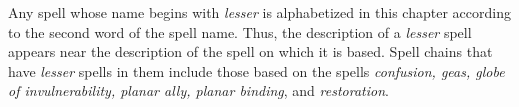 
Any spell whose name begins with \textit{lesser} is alphabetized in this chapter 
according to the second word of the spell name. Thus, the description of a \textit{lesser 
}spell appears near the description of the spell on which it is based. Spell chains 
that have \textit{lesser} spells in them include those based on the spells \textit{confusion, 
geas, globe of invulnerability, planar ally, planar binding}, and \textit{restoration}.

